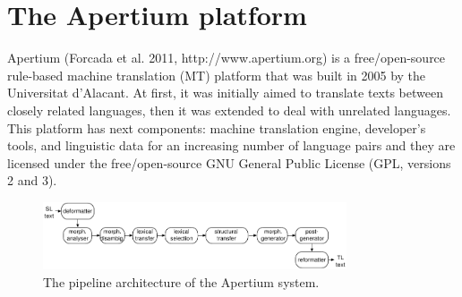 \documentclass[11pt]{article}
\begin{document}
\section{The Apertium platform}
Apertium (Forcada et al. 2011, http://www.apertium.org) is a free/open-source rule-based machine translation (MT) platform that was built in 2005 by the Universitat d’Alacant. At first, it was initially aimed to translate texts between closely related languages, then it was extended to deal with unrelated languages. This platform has next components: machine translation engine, developer’s tools, and linguistic data for an increasing number of language pairs and they are licensed under the free/open-source GNU General Public License (GPL, versions 2 and 3).

\begin{figure}[htbp]
\begin{center}
 \includegraphics[width=0.8\textwidth]{architecture.pdf}
\end{center}
\caption{The pipeline architecture of the Apertium system.}
\label{fig:modules}
\end{figure}
\end{document}
